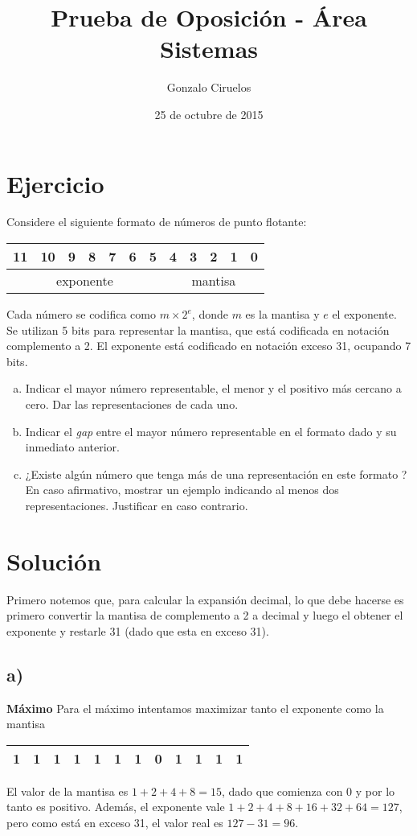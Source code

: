\documentclass[hidelinks,a4paper,10pt, nofootinbib]{article}
\title{Prueba de Oposición - Área Sistemas}
\author{Gonzalo Ciruelos}
\date{25 de octubre de 2015}
\begin{document}
\maketitle

\section*{Ejercicio}
Considere el siguiente formato de números de punto flotante:
\begin{center}
\begin{tabular}{|c|c|c|c|c|c|c|c|c|c|c|c|}
 11 & 10 & 9 & 8 & 7 & 6 & 5 & 4 & 3 & 2 & 1 & 0 \\ \hline
 \multicolumn{7}{|c|}{exponente} & \multicolumn{5}{c|}{mantisa} \\ \hline
\end{tabular}
\end{center}

Cada número se codifica como $m \times 2^e$, donde $m$ es la mantisa y $e$ el exponente. Se utilizan 5 bits para representar la mantisa, que está codificada en notación complemento a 2. El exponente está codificado en notación exceso 31, ocupando 7 bits.

\begin{enumerate}[a)]
    \item Indicar el mayor número representable, el menor y el positivo más cercano a cero. Dar las representaciones de cada uno.
    \item Indicar el \emph{gap} entre el mayor número representable en el formato dado y su inmediato anterior. 
    \item ¿Existe algún número que tenga más de una representación en este formato ? En caso afirmativo, mostrar un ejemplo indicando al menos dos representaciones. Justificar en caso contrario.
\end{enumerate}

\section*{Solución}
Primero notemos que, para calcular la expansión decimal, lo que debe hacerse es primero convertir la mantisa de complemento a 2 a decimal y luego el obtener el exponente y restarle 31 (dado que esta en exceso 31).

\subsection*{a)}
\textbf{Máximo} Para el máximo intentamos maximizar tanto el exponente como la mantisa
\begin{center}
\begin{tabular}{|c|c|c|c|c|c|c||c|c|c|c|c|}
\hline
1&1&1&1&1&1&1&0&1&1&1&1\\
\hline
\end{tabular}
\end{center}
El valor de la mantisa es $1+2+4+8 = 15$, dado que comienza con $0$ y por lo tanto es positivo.
Además, el exponente vale $1+2+4+8+16+32+64 = 127$, pero como está en exceso 31, el valor real es $127 - 31 = 96$.
\end{document}
